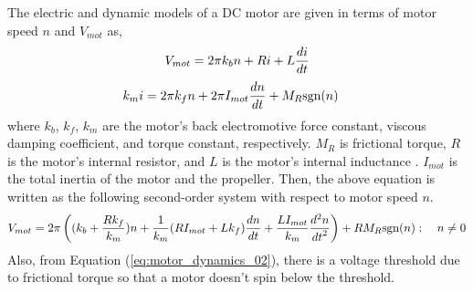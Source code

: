 The electric and dynamic models of a DC motor are given in terms of motor speed \(n\) and \(V_{mot}\) as,
\begin{equation}
\label{eq:motor_dynamics_01}
\begin{aligned}
V_{mot} & = 2 \pi k_{b} n + R i + L {{di}\over {dt}}\\
\end{aligned}
\end{equation}
\begin{equation}
\label{eq:motor_dynamics_02}
\begin{aligned}
k_m i & = 2 \pi k_f n + 2 \pi I_{mot} {{dn} \over {dt} } + M_R \text{sgn} (n)
\end{aligned}
\end{equation}
{\color{blue} where \(k_{b} \), \(k_f\), \(k_m\) are the motor's back electromotive force constant, viscous damping coefficient, and torque constant, respectively.} \(M_R\) is frictional torque, \(R\) is the motor's internal resistor, and \(L\) is the motor's internal inductance \cite{Mahfouz13}. \(I_{mot}\) is the total inertia of the motor and the propeller. Then, the above equation is written as the following second-order system with respect to motor speed \(n\). \\
\begin{equation}
\label{eq:motor_model_01}
\begin{aligned}
V_{mot} = 2 \pi \left( (k_b + {{R k_f}\over{k_m}} ) n + {1 \over {k_m}}( {R I_{mot}} + L k_f ) {{dn}\over{dt}} + {{L I_{mot}} \over {k_m} } {{d^2 n}\over{{dt}^2}}  \right) + R M_R \text{sgn} (n) : \quad n \neq 0\\
\end{aligned}
\end{equation}
Also, from Equation (\ref{eq:motor_dynamics_02}), there is a voltage threshold due to frictional torque so that a motor doesn't spin below the threshold. \\

